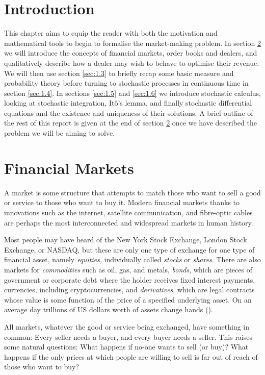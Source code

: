 \section{Introduction}
This chapter aims to equip the reader with both the motivation and mathematical 
tools to begin to formalise the market-making problem. In section \ref{sec:1.2}
we will introduce the concepts of financial markets, order books and dealers, and 
qualitatively describe how a dealer may wish to behave to optimise their revenue. We
will then use section \ref{sec:1.3} to briefly recap some basic measure and probability 
theory before turning to stochastic processes in continuous time in section 
\ref{sec:1.4}. In sections \ref{sec:1.5} and \ref{sec:1.6} we introduce stochastic 
calculus, looking at stochastic integration, It\^{o}'s lemma, and finally stochastic 
differential equations and the existence and uniqueness of their solutions. A brief 
outline of the rest of this report is given at the end of section \ref{sec:1.2}
once we have described the problem we will be aiming to solve.

\section{Financial Markets}\label{sec:1.2}
A market is some structure that attempts to match those who want to 
sell a good or service to those who want to buy it. Modern financial markets 
thanks to innovations such as the internet, satellite communication, and 
fibre-optic cables are perhaps the most interconnected and widespread markets in 
human history. 

Most people may have heard of the New York Stock Exchange, London Stock Exchange, 
or NASDAQ, but these are only one type of exchange for one type of financial asset, 
namely \emph{equities}, individually called \emph{stocks} 
or \emph{shares}. There are also markets for \emph{commodities} such as oil, gas, and metals, \emph{bonds}, 
which are pieces of government or corporate 
debt where the holder receives fixed interest payments, currencies, including 
cryptocurrencies, and \emph{derivatives}, which are legal contracts whose value is some 
function of the price of a specified underlying asset. On an average day
trillions of US dollars worth of assets change hands (\cite{ADV}).

All markets, whatever the good or service being exchanged, have something in common: 
Every seller needs a buyer, and every buyer needs a seller. This raises some 
natural questions: What happens if no-one wants to sell (or buy)? What happens if 
the only prices at which people are willing to sell is far out of reach of those 
who want to buy? 

